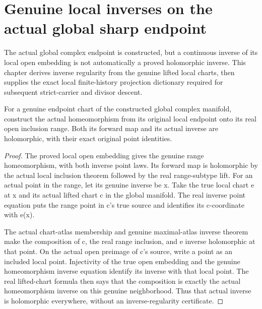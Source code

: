 \section{Genuine local inverses on the actual global sharp endpoint}

The actual global complex endpoint is constructed, but a continuous inverse
of its local open embedding is not automatically a proved holomorphic inverse.
This chapter derives inverse regularity from the genuine lifted local charts,
then supplies the exact local finite-history projection dictionary required
for subsequent strict-carrier and divisor descent.

\begin{lemma}
\label{hir:sharp-actual-endpoint-local-range-inverse-holomorphic}
\leanok
{}
For a genuine endpoint chart of the constructed global complex manifold,
construct the actual homeomorphism from its original local endpoint onto
its real open inclusion range. Both its forward map and its actual inverse
are holomorphic, with their exact original point identities.
\end{lemma}
\begin{proof}
The proved local open embedding gives the genuine range homeomorphism,
with both inverse point laws. Its forward map is holomorphic by the actual
local inclusion theorem followed by the real range-subtype lift. For an
actual point in the range, let its genuine inverse be x. Take the true local
chart e at x and its actual lifted chart c in the global manifold. The real
inverse point equation puts the range point in c's true source and identifies
its c-coordinate with e(x).

The actual chart-atlas membership and genuine maximal-atlas inverse theorem
make the composition of c, the real range inclusion, and e inverse holomorphic
at that point. On the actual open preimage of c's source, write a point as an
included local point. Injectivity of the true open embedding and the genuine
homeomorphism inverse equation identify its inverse with that local point.
The real lifted-chart formula then says that the composition is exactly the
actual homeomorphism inverse on this genuine neighborhood. Thus that actual
inverse is holomorphic everywhere, without an inverse-regularity certificate.
\end{proof}

